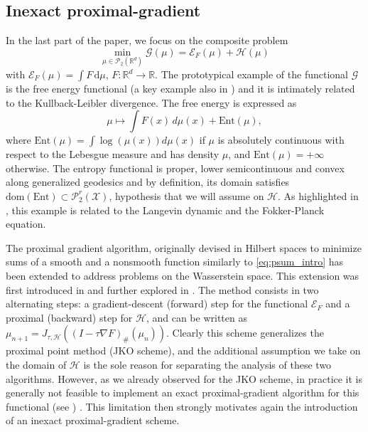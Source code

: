 \documentclass[11pt]{article}
\newcommand{\cP}{\mathcal{P}}
\newcommand{\cE}{\mathcal{E}}
\newcommand{\cG}{\mathcal{G}}
\newcommand{\calH}{\mathcal{H}}
\newcommand{\R}{\mathbb{R}}
\numberwithin{equation}{section}
\begin{document}
\subsection{Inexact proximal-gradient}
In the last part of the paper, we focus on the composite problem
	\begin{equation}
		\label{eq:psum_intro}
		\min_{\mu\in\cP_2(\R^d)} \cG (\mu) = \mathcal{E}_F(\mu)+\mathcal{H}(\mu)
	\end{equation}
	with $\mathcal{E}_F(\mu)= \int F \, \mathrm{d}\mu$, $F:\R^d\to \R$. The prototypical example of the functional $\cG$ is the free energy functional (a key example also in \cite{WPG2020}) and it is intimately related to the Kullback-Leibler divergence.   The free energy is expressed as
	\[\mu \mapsto \int F(x) \, d\mu(x) + \text{Ent}(\mu),\]
	where $\text{Ent}(\mu)=\int \log(\mu(x)) d\mu(x)$ if $\mu$ is absolutely continuous with respect to the Lebesgue measure and has density $\mu$, and $\text{Ent}(\mu)=+\infty$ otherwise. The entropy functional is proper, lower semicontinuous and convex along generalized geodesics and by definition, its domain satisfies $\text{dom}(\text{Ent})\subset \cP_2^r(\mathcal{X})$, hypothesis that we will assume on $\mathcal{H}$. As highlighted in \cite{WPG2020}, this example is related to the Langevin dynamic and the Fokker-Planck equation. 
	
	The proximal gradient algorithm, originally devised in Hilbert spaces to minimize  sums of a smooth and a nonsmooth function similarly to \eqref{eq:psum_intro} has been extended to address problems on the Wasserstein space. This extension was first introduced  in \cite{Wibisono18} and further explored in \cite{WPG2020}.
	The method consists in two alternating steps: a gradient-descent (forward) step for the functional $\cE_F$ and a proximal (backward) step for $\mathcal{H}$, and can be written as $\mu_{n+1}=J_{\tau , \calH}\left( (I-\tau \nabla F)_{\#}(\mu_n)\right)$. Clearly this scheme generalizes the proximal point method (JKO scheme), and the additional assumption we take on the domain of $\mathcal{H}$ is the sole reason for separating the  analysis of these two algorithms.
	However, as we already observed for the JKO scheme, in practice it is generally not feasible to implement an exact proximal-gradient algorithm for this functional (see \cite[Section 4.1]{Wibisono18}) . This limitation then strongly motivates again the introduction of an inexact proximal-gradient scheme.
	
\end{document}
